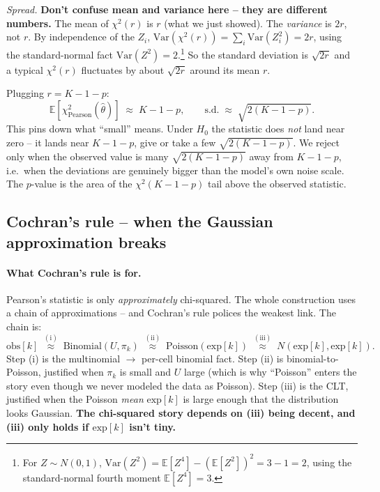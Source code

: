 \documentclass[11pt]{article}
\newcommand{\E}{\mathbb{E}}
\newcommand{\Var}{\mathrm{Var}}
\newcommand{\Pois}{\mathrm{Poisson}}
\newcommand{\Bin}{\mathrm{Binomial}}
\newcommand{\obs}{\mathrm{obs}}
\newcommand{\expc}{\mathrm{exp}}
\begin{document}
\emph{Spread.} \textbf{Don't confuse mean and variance here -- they are
different numbers.} The mean of $\chi^{2}(r)$ is $r$ (what we just showed).
The \emph{variance} is $2r$, not $r$. By independence of the $Z_i$,
$\Var(\chi^{2}(r)) = \sum_i \Var(Z_i^2) = 2r$, using the standard-normal
fact $\Var(Z^2) = 2$.\footnote{For $Z \sim N(0,1)$, $\Var(Z^2) = \E[Z^4] -
(\E[Z^2])^2 = 3 - 1 = 2$, using the standard-normal fourth moment
$\E[Z^4] = 3$.} So the standard deviation is $\sqrt{2r}$ and a typical
$\chi^{2}(r)$ fluctuates by about $\sqrt{2r}$ around its mean $r$.

Plugging $r = K - 1 - p$:
\[
   \E[\chi^{2}_{\text{Pearson}}(\hat\theta)] \;\approx\; K - 1 - p,
   \qquad
   \text{s.d.} \;\approx\; \sqrt{2(K - 1 - p)}.
\]
This pins down what ``small'' means. Under $H_0$ the statistic does
\emph{not} land near zero -- it lands near $K - 1 - p$, give or take a few
$\sqrt{2(K-1-p)}$. We reject only when the observed value is many
$\sqrt{2(K-1-p)}$ away from $K - 1 - p$, i.e.\ when the deviations are
genuinely bigger than the model's own noise scale. The $p$-value is the
area of the $\chi^{2}(K-1-p)$ tail above the observed statistic.

\subsection{Cochran's rule -- when the Gaussian approximation breaks}

\paragraph{What Cochran's rule is for.}
Pearson's statistic is only \emph{approximately} chi-squared. The whole
construction uses a chain of approximations -- and Cochran's rule polices
the weakest link. The chain is:
\[
   \obs[k] \;\overset{(\mathrm{i})}{\approx}\; \Bin(U, \pi_k)
           \;\overset{(\mathrm{ii})}{\approx}\; \Pois(\expc[k])
           \;\overset{(\mathrm{iii})}{\approx}\; N(\expc[k], \expc[k]).
\]
Step (i) is the multinomial $\to$ per-cell binomial fact. Step (ii) is
binomial-to-Poisson, justified when $\pi_k$ is small and $U$ large (which is
why ``Poisson'' enters the story even though we never modeled the data as
Poisson). Step (iii) is the CLT, justified when the Poisson \emph{mean}
$\expc[k]$ is large enough that the distribution looks Gaussian. \textbf{The
chi-squared story depends on (iii) being decent, and (iii) only holds if
$\expc[k]$ isn't tiny.}
\end{document}
